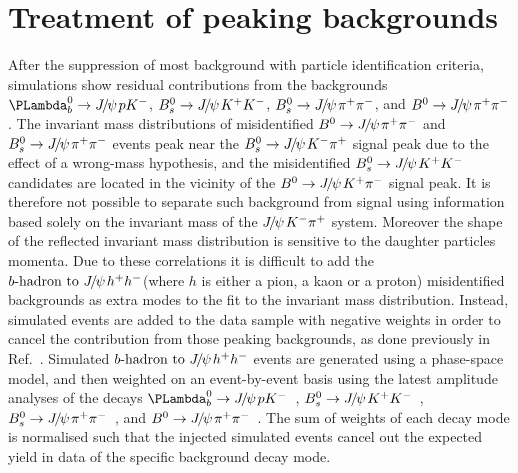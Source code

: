 \documentclass[12pt,a4paper]{article}
\def\PJ      {\ensuremath{J}\xspace}
\def\Ppsi {\ensuremath{\psi}\xspace}
\def\jpsi     {{\ensuremath{{\PJ\mskip -3mu/\mskip -2mu\Ppsi\mskip 2mu}}}\xspace}
\def\Jpsi     {{\ensuremath{\jpsi}}\xspace}
\newcommand{\Lambdab}{\ensuremath{\PLambda^0_b}\xspace}
\newcommand{\bJpsihh}{\ensuremath{b{\text{-hadron}}~{\text{to}}~\jpsi h^+h^-}\xspace}
\newcommand{\BdJpsiKpi}{\ensuremath{B^0\to \jpsi \Kp \pim}\xspace}
\newcommand{\BsJpsiKpi}{\ensuremath{B^0_s\to \jpsi \Km \pip}\xspace}
\newcommand{\BdJpsipipi}{\ensuremath{B^0\to \jpsi \pi^+\pi^-}\xspace}
\newcommand{\BsJpsipipi}{\ensuremath{B^0_s\to \jpsi \pi^+\pi^-}\xspace}
\newcommand{\BsJpsiKK}{\ensuremath{B^0_s\to \jpsi K^+K^-}\xspace}
\newcommand{\LbJpsipK}{\ensuremath{\Lambdab\to\Jpsi p K^-}\xspace}
\newcommand{\Km}{\ensuremath{K^-}\xspace}
\newcommand{\Kp}{\ensuremath{K^+}\xspace}
\newcommand{\pim}{\ensuremath{\pi^-}\xspace}
\newcommand{\pip}{\ensuremath{\pi^+}\xspace}
\begin{document}
\section{Treatment of peaking backgrounds}
\label{sec:peaking}
After the suppression of most background with particle identification criteria, simulations show residual contributions from the backgrounds \mbox{\LbJpsipK}, \BsJpsiKK, \BsJpsipipi, and \BdJpsipipi. 
The invariant mass distributions of misidentified \BdJpsipipi and \BsJpsipipi
events peak near the \BsJpsiKpi signal peak due to the effect of a wrong-mass hypothesis, and the misidentified \BsJpsiKK candidates are located in the vicinity of the \BdJpsiKpi signal peak.
It is therefore not possible to separate such background from signal using information based solely on
the invariant mass of the $\Jpsi \Km\pip$ system. 
Moreover the shape of the reflected invariant mass distribution is sensitive to the daughter particles momenta. 
Due to these correlations it is difficult to add the \bJpsihh (where $h$ is either a pion, a kaon or a proton) misidentified backgrounds as extra modes to the fit to the invariant mass distribution. 
Instead, simulated events are added to the data sample with negative weights in order to cancel
the contribution from those peaking backgrounds, as done previously in Ref.~\cite{LHCb-PAPER-2014-059}.
Simulated \bJpsihh events are generated using a phase-space model, and then weighted 
on an event-by-event basis using the latest amplitude analyses of the decays \LbJpsipK~\cite{LHCb-PAPER-2015-029}, 
\BsJpsiKK~\cite{LHCb-PAPER-2012-040}, \BsJpsipipi~\cite{LHCb-PAPER-2013-069}, and \BdJpsipipi~\cite{LHCb-PAPER-2014-012}. 
The sum of weights of each decay mode is normalised such that the injected simulated events cancel out the expected yield in data of the specific background decay mode.
\end{document}
